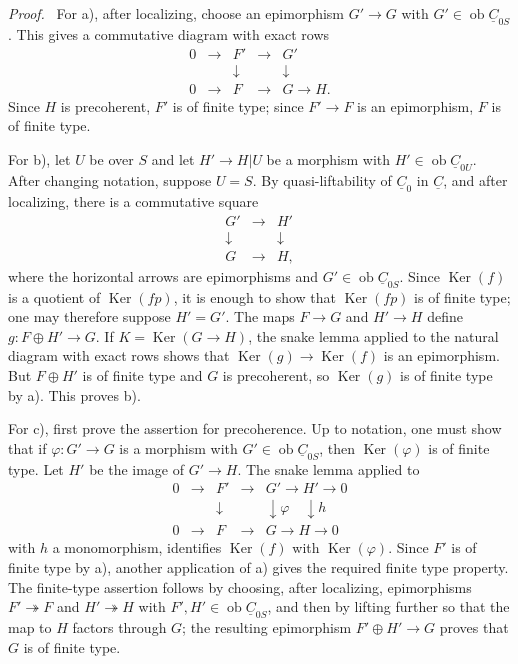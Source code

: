 \documentclass[13pt]{extarticle}
\newcommand{\uC}{\underline C}
\newcommand{\ob}{\operatorname{ob}}
\newcommand{\Ker}{\operatorname{Ker}}
\newenvironment{prooftext}[1][Proof]{\par\noindent\emph{#1.}\ }{\par\medskip}
\begin{document}
\begin{prooftext}
For a), after localizing, choose an epimorphism $G'\to G$ with $G'\in\ob\uC_{0S}$. This gives a commutative diagram with exact rows
\[
\begin{array}{ccccc}
0&\longrightarrow&F'&\longrightarrow&G'\\
&&\downarrow&&\downarrow\\
0&\longrightarrow&F&\longrightarrow&G\longrightarrow H.
\end{array}
\]
Since $H$ is precoherent, $F'$ is of finite type; since $F'\to F$ is an epimorphism, $F$ is of finite type.

For b), let $U$ be over $S$ and let $H'\to H|U$ be a morphism with $H'\in\ob\uC_{0U}$. After changing notation, suppose $U=S$. By quasi-liftability of $\uC_0$ in $\uC$, and after localizing, there is a commutative square
\[
\begin{array}{ccc}
G'&\longrightarrow&H'\\
\downarrow&&\downarrow\\
G&\longrightarrow&H,
\end{array}
\]
where the horizontal arrows are epimorphisms and $G'\in\ob\uC_{0S}$. Since $\Ker(f)$ is a quotient of $\Ker(fp)$, it is enough to show that $\Ker(fp)$ is of finite type; one may therefore suppose $H'=G'$. The maps $F\to G$ and $H'\to H$ define $g:F\oplus H'\to G$. If $K=\Ker(G\to H)$, the snake lemma applied to the natural diagram with exact rows shows that $\Ker(g)\to\Ker(f)$ is an epimorphism. But $F\oplus H'$ is of finite type and $G$ is precoherent, so $\Ker(g)$ is of finite type by a). This proves b).

For c), first prove the assertion for precoherence. Up to notation, one must show that if $\varphi:G'\to G$ is a morphism with $G'\in\ob\uC_{0S}$, then $\Ker(\varphi)$ is of finite type. Let $H'$ be the image of $G'\to H$. The snake lemma applied to
\[
\begin{array}{ccccc}
0&\longrightarrow&F'&\longrightarrow&G'\longrightarrow H'\longrightarrow0\\
&&\downarrow&&\downarrow\varphi\quad\downarrow h\\
0&\longrightarrow&F&\longrightarrow&G\longrightarrow H\longrightarrow0
\end{array}
\]
with $h$ a monomorphism, identifies $\Ker(f)$ with $\Ker(\varphi)$. Since $F'$ is of finite type by a), another application of a) gives the required finite type property. The finite-type assertion follows by choosing, after localizing, epimorphisms $F'\twoheadrightarrow F$ and $H'\twoheadrightarrow H$ with $F',H'\in\ob\uC_{0S}$, and then by lifting further so that the map to $H$ factors through $G$; the resulting epimorphism $F'\oplus H'\to G$ proves that $G$ is of finite type.
\end{prooftext}
\end{document}
